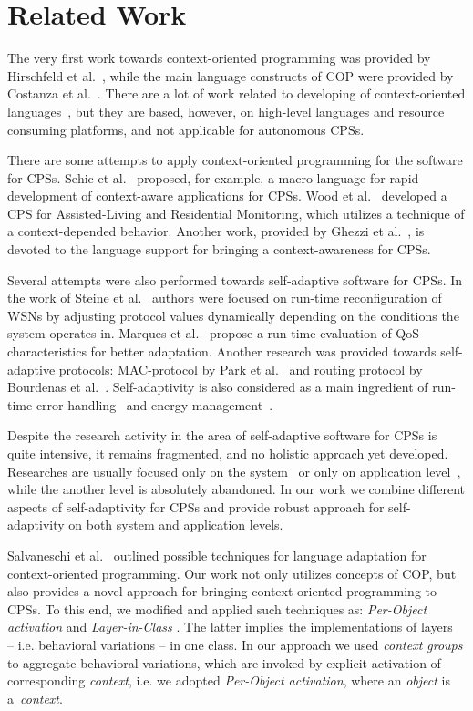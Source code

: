 \section{Related Work}
\label{sec:related}

The very first work towards context-oriented programming was provided by Hirschfeld et al.~\cite{Hirschfeld08}, while the main language constructs of COP were provided by Costanza et al.~\cite{Costanza11}. There are a lot of work related to developing of context-oriented languages~\cite{Sehic11,Kamina11,Bardram05}, but they are based, however, on high-level languages and resource consuming platforms, and not applicable for autonomous CPSs.

There are some attempts to apply context-oriented programming for the software for CPSs. Sehic et al.~\cite{Sehic11} proposed, for example, a macro-language for rapid development of context-aware applications for CPSs. Wood et al.~\cite{Wood08} developed a CPS for Assisted-Living and Residential Monitoring, which utilizes a technique of a context-depended behavior. Another work, provided by Ghezzi et al.~\cite{Ghezzi10}, is devoted to the language support for bringing a context-awareness for CPSs.

Several attempts were also performed towards self-adaptive software for CPSs. In the work of Steine et al.~\cite{Steine11} authors were focused on run-time reconfiguration of WSNs by adjusting protocol values dynamically depending on the conditions the system operates in. Marques et al.~\cite{Marques11} propose a run-time evaluation of QoS characteristics for better adaptation. Another research was provided towards self-adaptive protocols: MAC-protocol by Park et al.~\cite{Park08}  and routing protocol by Bourdenas et al.~\cite{Bourdenas11}. Self-adaptivity is also considered as a main ingredient of run-time error handling~\cite{Bourdenas10} and energy management~\cite{Jiang07}. 

Despite the research activity in the area of self-adaptive software for CPSs is quite intensive, it remains fragmented, and no holistic approach yet developed. Researches are usually focused only on the system~\cite{Steine11,Marques11,Park08,Bourdenas11,Bourdenas10,Jiang07} or only on application level~\cite{Wood08,Sehic11,Ghezzi10}, while the another level is absolutely abandoned. In our work we combine different aspects of self-adaptivity for CPSs and provide robust approach for self-adaptivity on both system and application levels.

Salvaneschi et al.~\cite{Salvaneschi11,Salvaneschi12} outlined possible techniques for language adaptation for context-oriented programming. Our work not only utilizes concepts of COP, but also provides a novel approach for bringing context-oriented programming to CPSs. To this end, we modified and applied such techniques as: \emph{Per-Object activation} and \emph{Layer-in-Class} \cite{Salvaneschi12}. The latter implies the implementations of layers~\cite{Costanza11} -- i.e. behavioral variations -- in one class. In our approach we used \emph{context groups} to aggregate behavioral variations, which are invoked by explicit activation of corresponding \emph{context}, i.e. we adopted \emph{Per-Object activation}, where an \emph{object} is a~\emph{context}.